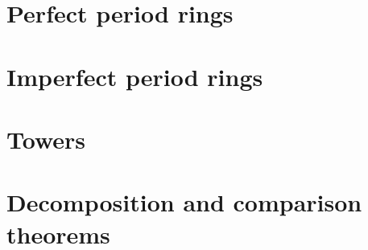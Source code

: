 \section{Perfect period rings}

\section{Imperfect period rings}

\section{Towers}

\section{Decomposition and comparison theorems}
